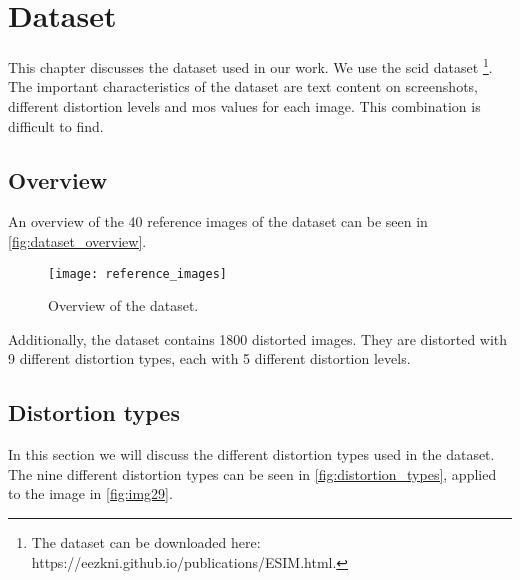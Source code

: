 \chapter{Dataset}
\label{ch:dataset}
This chapter discusses the dataset used in our work. We use the \gls{scid} dataset \cite{ni_esim_2017}\footnote{The dataset can be downloaded here: https://eezkni.github.io/publications/ESIM.html.}.
The important characteristics of the dataset are text content on screenshots, different distortion levels and \gls{mos} values for each image. This combination is difficult to find.

\section{Overview}
\label{sec:dataset_overview}
An overview of the 40 reference images of the dataset can be seen in \autoref{fig:dataset_overview}.

\begin{figure}[h]
    \centering
    \texttt{[image: reference\_images]}
    \caption{Overview of the dataset.}
    \label{fig:dataset_overview}
\end{figure}

Additionally, the dataset contains 1800 distorted images.
They are distorted with 9 different distortion types, each with 5 different distortion levels.

\section{Distortion types}
\label{sec:dataset_distortion_types}

In this section we will discuss the different distortion types used in the dataset.
The nine different distortion types can be seen in \autoref{fig:distortion_types}, applied to the image in \autoref{fig:img29}.

